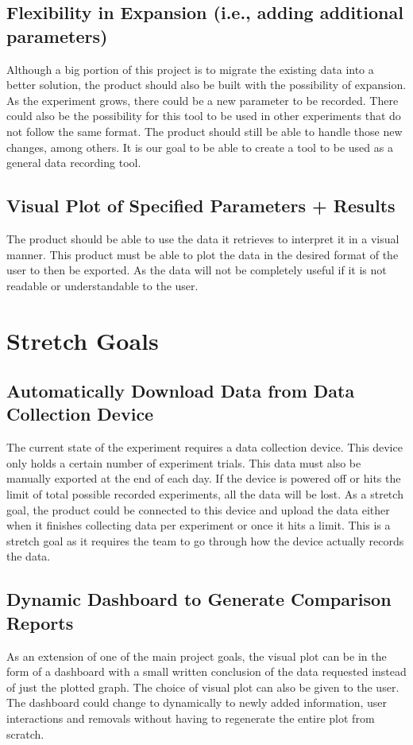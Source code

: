 \documentclass{article}
\begin{document}
\subsection*{Flexibility in Expansion (i.e., adding additional parameters)}
Although a big portion of this project is to migrate the existing data into a better solution, the product should also be
built with the possibility of expansion. As the experiment grows, there could be a new parameter to be recorded.
There could also be the possibility for this tool to be used in other experiments that do not follow the same format. The product should still be able to handle those new changes, among others.
It is our goal to be able to create a tool to be used as a general data recording tool.


\subsection*{Visual Plot of Specified Parameters + Results}
The product should be able to use the data it retrieves to interpret it in a visual manner.
This product must be able to plot the data in the desired format of the user to then be exported.
As the data will not be completely useful if it is not readable or understandable to the user.

\section{Stretch Goals}
\subsection*{Automatically Download Data from Data Collection Device}
The current state of the experiment requires a data collection device. This device only holds a certain number of experiment trials.
This data must also be manually exported at the end of each day. If the device is powered off or hits the limit of total possible recorded experiments, all the data will be lost.
As a stretch goal, the product could be connected to this device and upload the data either when it finishes collecting data per experiment or once it hits a limit.
This is a stretch goal as it requires the team to go through how the device actually records the data.


\subsection*{Dynamic Dashboard to Generate Comparison Reports}
As an extension of one of the main project goals, the visual plot can be in the form of a dashboard with a small written conclusion of the data requested instead of just the plotted graph.
The choice of visual plot can also be given to the user. The dashboard could change to dynamically to newly added information, user interactions and removals
without having to regenerate the entire plot from scratch.  
\end{document}
